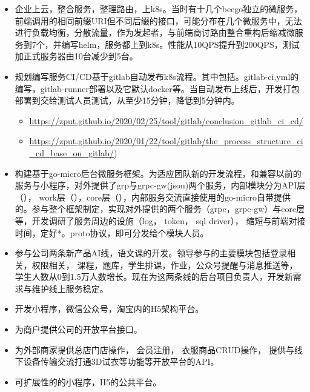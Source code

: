 \documentclass{resume}
\begin{document}
\begin{itemize}[parsep=0.2ex]
   \item 企业上云，整合服务，整理路由，上k8s。当时有十几个beego独立的微服务，前端调用的相同前缀URI但不同后缀的接口，可能分布在几个微服务中，无法进行负载均衡，分散流量，作为发起者，与前端商讨路由整合重构后缩减微服务到7个，并编写helm，服务都上到k8s。性能从10QPS提升到200QPS，测试加正式服务器由10台减少到5台。

   \item 规划编写服务CI/CD基于gitlab自动发布k8s流程。其中包括。gitlab-ci.yml的编写，gitlab-runner部署以及它默认docker等。当自动发布上线后，开发打包部署到交给测试人员测试，从至少15分钟，降低到5分钟内。
    \begin{itemize}[parsep=0.1ex]
      \item \url{https://zput.github.io/2020/02/25/tool/gitlab/conclusion_gitlab_ci_cd/}
      \item \url{https://zput.github.io/2020/01/22/tool/gitlab/the_process_structure_ci_cd_base_on_gitlab/})
    \end{itemize}

   \item 构建基于go-micro后台微服务框架。为适应团队新的开发流程，和兼容以前的服务与小程序，对外提供了grp与grpc-gw(json)两个服务，内部模块分为API层（）， work层（），core层（），内部服务交流直接使用的go-micro自带提供的。参与整个框架制定，实现对外提供的两个服务（grpc，grpc-gw）与core层等，开发调研了服务周边的设施（log， token， sql driver）， 缩短与前端对接时间，定好*。proto协议，即可分发给个模块人员。

   \item  参与公司两条新产品AI线，语文课的开发。领导参与的主要模块包括登录相关，权限相关， 课程，题库，学生排课，作业，公众号提醒与消息推送等， 学生人数从0到1.5万人数增长。现在为这两条线的后台项目负责人，开发新需求与维护线上服务稳定。
\end{itemize}

\begin{itemize}[parsep=0.2ex]
  \item 开发小程序，微信公众号，淘宝内的H5架构平台。
  \item 为商户提供公司的开放平台接口。
  \item 为外部商家提供总店门店操作， 会员注册， 衣服商品CRUD操作， 提供与线下设备传输交流打通3D试衣等功能等开放平台的API。
  \item 可扩展性的的小程序，H5的公共平台。
\end{itemize}
\end{document}
